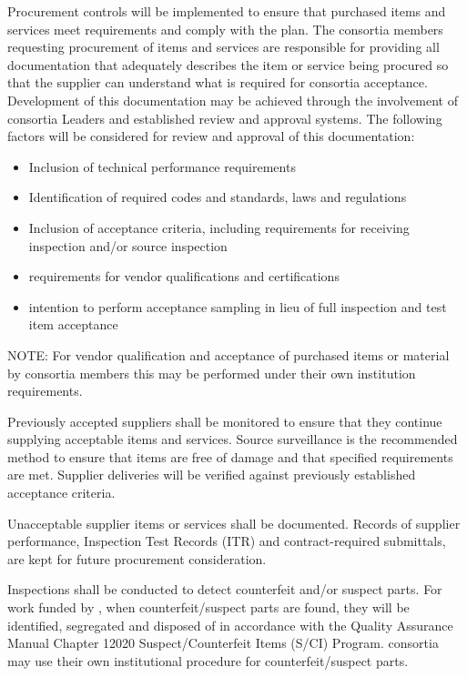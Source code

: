 Procurement controls will be implemented to ensure that
purchased items and services meet  requirements and comply
with the   plan.  The consortia members
requesting procurement of items and services are responsible for
providing all documentation that adequately describes the item or
service being procured so that the supplier can understand what is
required for consortia acceptance. Development of this documentation
may be achieved through the involvement of consortia Leaders and
established review and approval systems. The following factors will be
considered for review and approval of this documentation:
\begin{itemize}
 \item Inclusion of technical performance requirements
 \item Identification of required codes and standards, laws and
   regulations
 \item Inclusion of acceptance criteria, including requirements for
   receiving inspection and/or source inspection
 \item {} requirements for vendor qualifications and
   certifications
 \item {} intention to perform acceptance sampling in lieu
   of full inspection and test item acceptance
\end{itemize}
NOTE: For vendor qualification and acceptance of purchased items or
material by consortia members this may be performed under their own
institution requirements.

Previously accepted suppliers shall be monitored to ensure that they
continue supplying acceptable items and services. Source surveillance
is the recommended method to ensure that items are free of damage and
that specified requirements are met. Supplier deliveries will be
verified against previously established acceptance criteria.

Unacceptable supplier items or services shall be documented. Records
of supplier performance, Inspection Test Records (ITR) and
contract-required submittals, are kept for future procurement
consideration.

Inspections shall be conducted to detect counterfeit and/or suspect
parts. For work funded by , when counterfeit/suspect parts
are found, they will be identified, segregated and disposed of in
accordance with the \fnal Quality Assurance Manual Chapter 12020
Suspect/Counterfeit Items (S/CI) Program.  consortia may
use their own institutional procedure for counterfeit/suspect parts.

